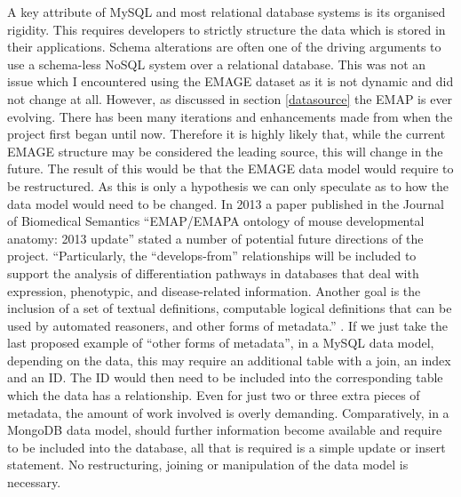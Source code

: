 A key attribute of MySQL and most relational database systems is its organised rigidity. This requires developers to strictly structure the data which is stored in their applications. Schema alterations are often one of the driving arguments to use a schema-less NoSQL system over a relational database. This was not an issue which I encountered using the EMAGE dataset as it is not dynamic and did not change at all. However, as discussed in section \ref{datasource} the EMAP is ever evolving. There has been many iterations and enhancements made from when the project first began until now. Therefore it is highly likely that, while the current EMAGE structure may be considered the leading source, this will change in the future. The result of this would be that the EMAGE data model would require to be restructured. As this is only a hypothesis we can only speculate as to how the data model would need to be changed. In 2013 a paper published in the Journal of Biomedical Semantics ``EMAP/EMAPA ontology of mouse developmental anatomy: 2013 update'' stated a number of potential future directions of the project. ``Particularly, the ``develops-from'' relationships will be included to support the analysis of differentiation pathways in databases that deal with expression, phenotypic, and disease-related information. Another goal is the inclusion of a set of textual definitions, computable logical definitions that can be used by automated reasoners, and other forms of metadata.'' \cite{biomed}. If we just take the last proposed example of ``other forms of metadata'', in a MySQL data model, depending on the data, this may require an additional table with a join, an index and an ID. The ID would then need to be included into the corresponding table which the data has a relationship. Even for just two or three extra pieces of metadata, the amount of work involved is overly demanding. Comparatively, in a MongoDB data model, should further information become available and require to be included into the database, all that is required is a simple update or insert statement. No restructuring, joining or manipulation of the data model is necessary.

